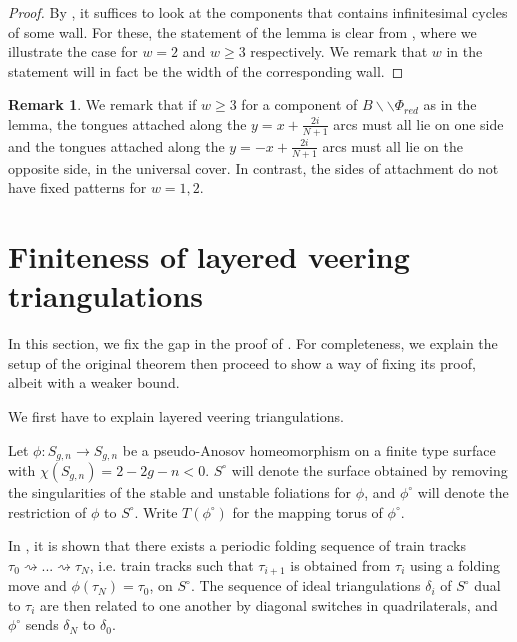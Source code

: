 \documentclass[12pt]{amsart}
\theoremstyle{definition}
\newtheorem{rmk}[thm]{Remark}
\numberwithin{equation}{section}
\begin{document}
\begin{proof}
By , it suffices to look at the components that contains infinitesimal cycles of some wall. For these, the statement of the lemma is clear from , where we illustrate the case for $w=2$ and $w \geq 3$ respectively. We remark that $w$ in the statement will in fact be the width of the corresponding wall. 
\end{proof}

\begin{rmk} \label{rmk:stablegluesides}
We remark that if $w \geq 3$ for a component of $B \backslash \backslash \Phi_{red}$ as in the lemma, the tongues attached along the $y=x+\frac{2i}{N+1}$ arcs must all lie on one side and the tongues attached along the $y=-x+\frac{2i}{N+1}$ arcs must all lie on the opposite side, in the universal cover. In contrast, the sides of attachment do not have fixed patterns for $w=1,2$.
\end{rmk}

\section{Finiteness of layered veering triangulations} \label{sec:finiteness}

In this section, we fix the gap in the proof of \cite[Theorem 6.2]{Ago11}. For completeness, we explain the setup of the original theorem then proceed to show a way of fixing its proof, albeit with a weaker bound.

We first have to explain layered veering triangulations.

Let $\phi:S_{g,n} \to S_{g,n}$ be a pseudo-Anosov homeomorphism on a finite type surface with $\chi(S_{g,n})=2-2g-n<0$. $S^\circ$ will denote the surface obtained by removing the singularities of the stable and unstable foliations for $\phi$, and $\phi^\circ$ will denote the restriction of $\phi$ to $S^\circ$. Write $T(\phi^\circ)$ for the mapping torus of $\phi^\circ$.

In \cite{Ago11}, it is shown that there exists a periodic folding sequence of train tracks $\tau_0 \rightsquigarrow ...  \rightsquigarrow \tau_N$, i.e. train tracks such that $\tau_{i+1}$ is obtained from $\tau_i$ using a folding move and $\phi(\tau_N)=\tau_0$, on $S^\circ$. The sequence of ideal triangulations $\delta_i$ of $S^\circ$ dual to $\tau_i$ are then related to one another by diagonal switches in quadrilaterals, and $\phi^\circ$ sends $\delta_N$ to $\delta_0$. 
\end{document}
